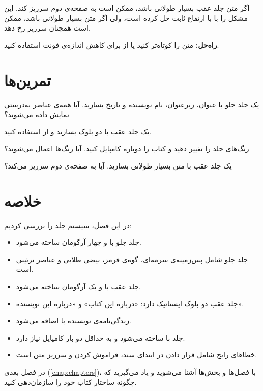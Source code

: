 اگر متن جلد عقب بسیار طولانی باشد، ممکن است
به صفحه‌ی دوم سرریز کند.  این
مشکل را با  با ارتفاع ثابت حل
کرده است، ولی اگر متن بسیار طولانی باشد،
ممکن است همچنان سرریز رخ دهد.

\textbf{راه‌حل:} متن را کوتاه‌تر کنید یا از
 برای کاهش اندازه‌ی فونت استفاده کنید.

\section{تمرین‌ها}
\label{sec:cover-exercises}

\begin{exercise}
    یک جلد جلو با عنوان، زیرعنوان، نام نویسنده
    و تاریخ بسازید. آیا همه‌ی عناصر به‌درستی
    نمایش داده می‌شوند؟
    \label{exc:cover-front}
\end{exercise}

\begin{exercise}
    یک جلد عقب با دو بلوک بسازید و از
     استفاده کنید.
    \label{exc:cover-back}
\end{exercise}

\begin{exercise}
    رنگ‌های جلد را تغییر دهید و کتاب را
    دوباره کامپایل کنید. آیا رنگ‌ها اعمال
    می‌شوند؟
    \label{exc:cover-colors}
\end{exercise}

\begin{exercise}
    یک جلد عقب با متن بسیار طولانی بسازید.
    آیا به صفحه‌ی دوم سرریز می‌کند؟
    \label{exc:cover-overflow}
\end{exercise}

\section{خلاصه}
\label{sec:cover-summary}

در این فصل، سیستم جلد  را بررسی
کردیم:

\begin{itemize}
    \item جلد جلو با  و چهار
    آرگومان ساخته می‌شود.

    \item جلد جلو شامل پس‌زمینه‌ی سرمه‌ای، گوه‌ی
    قرمز، بیضی طلایی و عناصر تزئینی است.

    \item جلد عقب با  و یک
    آرگومان ساخته می‌شود.

    \item جلد عقب دو بلوک ایستاتیک دارد:
    «درباره این کتاب» و «درباره این نویسنده».

    \item زندگی‌نامه‌ی نویسنده با 
    اضافه می‌شود.

    \item جلد با  ساخته می‌شود و به
    حداقل دو بار کامپایل نیاز دارد.

    \item خطاهای رایج شامل قرار دادن
     در ابتدای سند، فراموش
    کردن  و سرریز متن است.
\end{itemize}

در فصل بعدی (\cref{chap:chapters})، با فصل‌ها
و بخش‌ها آشنا می‌شوید و یاد می‌گیرید که چگونه
ساختار کتاب خود را سازمان‌دهی کنید.